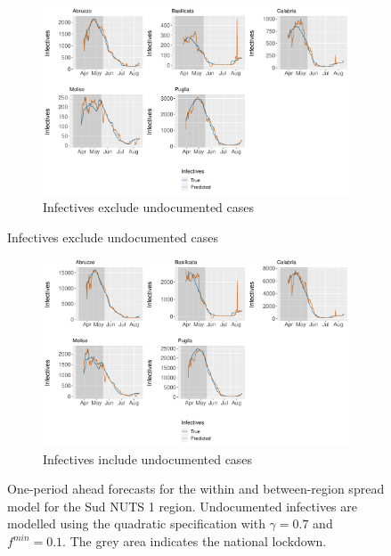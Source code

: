 \documentclass[12pt]{article}
\begin{document}
\begin{appendices}
        \begin{figure}[H]
    	    \centering
    	    \begin{subfigure}{\textwidth}
    	      \centering
    	      \includegraphics[width=0.91\linewidth]{output/model_between_lag14_forecast_start20_Sud_rolling.pdf}
    	      \caption{Infectives exclude undocumented cases}
    	      \label{fig:forecast_between_sud_regular}
    	    \end{subfigure}
        \end{figure}
        \begin{figure}[H]\ContinuedFloat
    	    \begin{subfigure}{\textwidth}
    	      \centering
    	      \includegraphics[width=0.91\linewidth]{output/model_between_lag14_forecast_start20_Sud_UndocQuadratic_rolling.pdf}
    	      \caption{Infectives include undocumented cases}
    	      \label{fig:forecast_between_sud_undoc}
    	    \end{subfigure}
    	    \caption{One-period ahead forecasts for the within and between-region spread model for the Sud NUTS 1 region. Undocumented infectives are modelled using the quadratic specification with $\gamma = 0.7$ and $f^{min}=0.1$. The grey area indicates the national lockdown.}
    	    \label{fig:forecast_between_sud}
        \end{figure}
        

\end{appendices}
\end{document}
